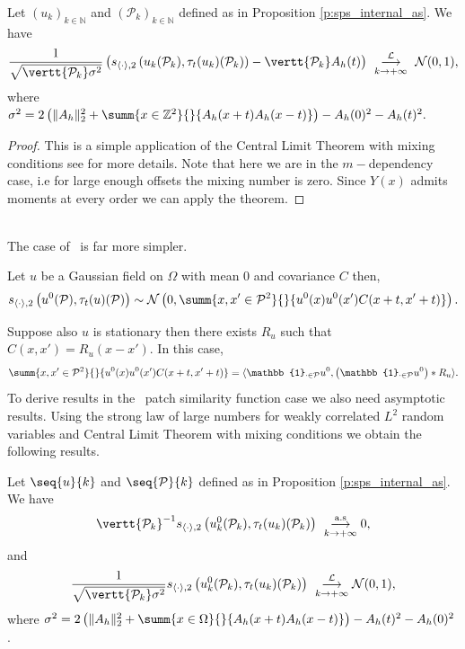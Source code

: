 \begin{prop}
  Let $(u_k)_{k \in \mathbb{N}}$ and
  $\left(\mathcal{P}_k\right)_{k \in \mathbb{N}}$ defined as in Proposition \ref{p:sps_internal_as}. We have
  \[\frac{1}{ \sqrt{\vertt{\mathcal{P}_k}\sigma^2}} \left(s_{\langle \cdot
        \rangle,2}\left(u_k(\mathcal{P}_k),
        \tau_t(u_k)(\mathcal{P}_k) \right) -
      \vertt{\mathcal{P}_k}A_h(t)\right) \ \underset{k \rightarrow
      +\infty}{\overset{\mathcal{L}}{\longrightarrow}} \ \mathcal{N}(0,1),\]
  where
  $\sigma^2 = 2 \left( \| A_h \|_2^2 + \summ{x \in
      \mathbb{Z}^2}{}{A_h(x+t)A_h(x-t)}\right) - A_h(0)^2 - A_h(t)^2.$
  \label{p:spsinternal}
\end{prop}
\begin{proof}
  This is a simple application of the Central Limit Theorem with mixing
  conditions see \cite{billingsley2013convergence} for more details. Note that
  here we are in the $m-$dependency case, i.e for large enough offsets the mixing
  number is zero. Since $Y(x)$ admits moments at every order we can apply the
  theorem.
\end{proof}
\\
The case of \templatematching \ is far more simpler.
\begin{prop}
  Let $u$ be a Gaussian field on $\Omega$ with mean $0$ and covariance $C$ then,
  \[s_{\langle \cdot \rangle, 2}\left( u^0(\mathcal{P}),
      \tau_t(u)(\mathcal{P})\right) \sim \mathcal{N}\left(0,\summ{x,x' \in
        \mathcal{P}^2}{}{u^0(x)u^0(x')C(x+t,x'+t)} \right).\]
  \label{p:spstemplate}
\end{prop}
Suppose also $u$ is stationary then there exists $R_u$ such that
$C(x,x') = R_u(x-x')$. In this case,
\[\summ{x,x' \in \mathcal{P}^2}{}{u^0(x)u^0(x')C(x+t,x'+t)} = \langle
  \mathbb{1}_{\cdot \in \mathcal{P}}u^0, \left(\mathbb{1}_{\cdot \in
      \mathcal{P}}u^0\right) * R_u\rangle.\] To derive results in the \scos \
patch similarity function case we also need asymptotic results. Using the strong
law of large numbers for weakly correlated $L^2$ random variables and Central
Limit Theorem with mixing conditions we obtain the following results.
\begin{prop}
  Let $\seq{u}{k}$ and $\seq{\mathcal{P}}{k}$ defined as in Proposition \ref{p:sps_internal_as}.
  We have
  \[
    \vertt{\mathcal{P}_k}^{-1} s_{\langle \cdot \rangle,2} \left(u_k^0(\mathcal{P}_k), \tau_t(u_k)(\mathcal{P}_k) \right) \
    \overset{\text{a.s}}{\underset{k \rightarrow +\infty}{\longrightarrow}} 0,\]
  and
  \[
    \frac{1}{\sqrt{\vertt{\mathcal{P}_k} \sigma^2}} s_{\langle \cdot \rangle,2}
    \left(u_k^0(\mathcal{P}_k), \tau_t(u_k)(\mathcal{P}_k) \right) \
    \overset{\mathcal{L}}{\underset{k \rightarrow +\infty}{\longrightarrow}}
    \mathcal{N}(0,1),\] where
    $\sigma^2 = 2 \left(\|A_h\|_2^2 + \summ{x \in
      \Omega}{}{A_h(x+t)A_h(x-t)}\right) - A_h(t)^2 - A_h(0)^2$.
\label{p:spstemplateasymp}
\end{prop}
